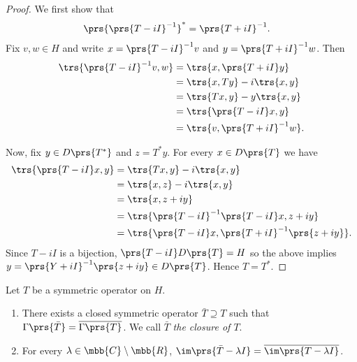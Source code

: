 \documentclass[10pt, twoside]{book}
\begin{document}
\begin{proof}
We first show that
\begin{align*}
\prs{\prs{T - iI}^{-1}}^* &= \prs{T + iI}^{-1} \text{.}
\end{align*}
Fix $v,w \in H$ and write $x = \prs{T - iI}^{-1} v$ and $y = \prs{T + iI}^{-1} w$. Then
\begin{align*}
\trs{\prs{T-iI}^{-1} v, w} &= \trs{x, \prs{T+iI}y}
\\&= \trs{x, T y} - i\trs{x,y}
\\&= \trs{Tx,y} - y\trs{x,y}
\\&= \trs{\prs{T - iI}x, y}
\\&= \trs{v, \prs{T+iI}^{-1}w} \text{.}
\end{align*} 

Now, fix $y \in D\prs{T^*}$ and $z = T^* y$. For every $x \in D\prs{T}$ we have
\begin{align*}
\trs{\prs{T - iI}x, y} &= \trs{Tx, y} - i\trs{x,y}
\\&= \trs{x,z} - i\trs{x,y}
\\&= \trs{x, z+iy}
\\&= \trs{\prs{T - iI}^{-1} \prs{T - iI}x, z+iy}
\\&= \trs{\prs{T - iI}x, \prs{T + iI}^{-1}\prs{z+iy}} \text{.}
\end{align*}
Since $T - iI$ is a bijection, $\prs{T - iI}D\prs{T} = H$ so the above implies $y = \prs{Y + iI}^{-1}\prs{z + iy} \in D\prs{T}$.
Hence $T = T^*$.
\end{proof}

\begin{proposition}
Let $T$ be a symmetric operator on $H$.
\begin{enumerate}
\item There exists a closed symmetric operator $\bar{T} \supseteq T$ such that $\Gamma\prs{\bar{T}} = \overline{\Gamma\prs{T}}$. We call $\bar{T}$ \emph{the closure of $T$}.
\item For every $\lambda \in \mbb{C} \setminus \mbb{R}$, $\im\prs{\bar{T} - \lambda I} = \overline{\im\prs{T - \lambda I}}$.
\end{enumerate}
\end{proposition}
\end{document}
